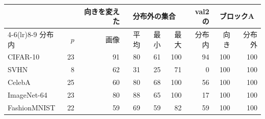 \documentclass[border=3pt]{standalone}
\begin{document}
%
\begin{tabular}{lrrrrrrrr}%
\toprule
 & & 向きを変えた & \multicolumn{3}{c}{分布外の集合} & val2の & \multicolumn{2}{c}{ブロックA}\\
\cmidrule(lr){4-6}\cmidrule(lr){8-9}
分布内 & $p$ & 画像 & 平均 & 最小 & 最大 & 分布内 & 向き & 分布外\\
\midrule
CIFAR-10 & 23 & 91 & 80 & 61 & 100 & 94 & 100 & 100\\
SVHN & 8 & 62 & 31 & 25 & 71 & 0 & 100 & 100\\
CelebA & 25 & 60 & 80 & 68 & 100 & 56 & 100 & 100\\
ImageNet-64 & 23 & 80 & 88 & 65 & 100 & 17 & 100 & 100\\
FashionMNIST & 22 & 59 & 69 & 59 & 82 & 59 & 100 & 100\\
\bottomrule
\end{tabular}%
\end{document}

